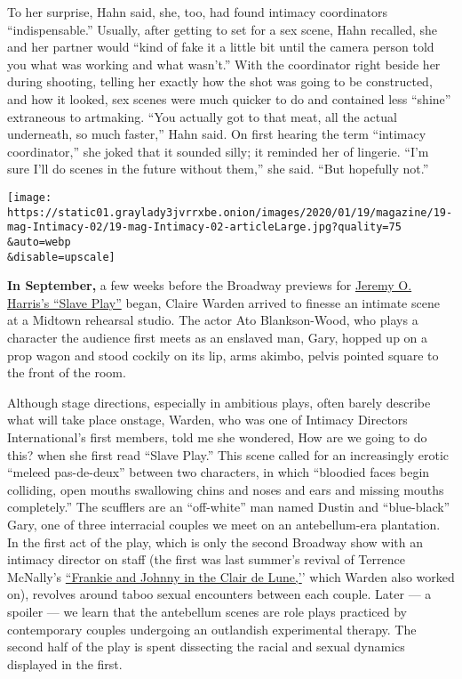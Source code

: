 To her surprise, Hahn said, she, too, had found intimacy coordinators
``indispensable.'' Usually, after getting to set for a sex scene, Hahn
recalled, she and her partner would ``kind of fake it a little bit until
the camera person told you what was working and what wasn't.'' With the
coordinator right beside her during shooting, telling her exactly how
the shot was going to be constructed, and how it looked, sex scenes were
much quicker to do and contained less ``shine'' extraneous to artmaking.
``You actually got to that meat, all the actual underneath, so much
faster,'' Hahn said. On first hearing the term ``intimacy coordinator,''
she joked that it sounded silly; it reminded her of lingerie. ``I'm sure
I'll do scenes in the future without them,'' she said. ``But hopefully
not.''

\texttt{[image: https://static01.graylady3jvrrxbe.onion/images/2020/01/19/magazine/19-mag-Intimacy-02/19-mag-Intimacy-02-articleLarge.jpg?quality=75\\\&auto=webp\\\&disable=upscale]}

\textbf{In September,} a few weeks before the Broadway previews for
\href{https://www.nytimes3xbfgragh.onion/2019/10/06/theater/slave-play-review-broadway.html}{Jeremy
O. Harris's ``Slave Play''} began, Claire Warden arrived to finesse an
intimate scene at a Midtown rehearsal studio. The actor Ato
Blankson-Wood, who plays a character the audience first meets as an
enslaved man, Gary, hopped up on a prop wagon and stood cockily on its
lip, arms akimbo, pelvis pointed square to the front of the room.

Although stage directions, especially in ambitious plays, often barely
describe what will take place onstage, Warden, who was one of Intimacy
Directors International's first members, told me she wondered, How are
we going to do this? when she first read ``Slave Play.'' This scene
called for an increasingly erotic ``meleed pas-de-deux'' between two
characters, in which ``bloodied faces begin colliding, open mouths
swallowing chins and noses and ears and missing mouths completely.'' The
scufflers are an ``off-white'' man named Dustin and ``blue-black'' Gary,
one of three interracial couples we meet on an antebellum-era
plantation. In the first act of the play, which is only the second
Broadway show with an intimacy director on staff (the first was last
summer's revival of Terrence McNally's
\href{https://www.nytimes3xbfgragh.onion/2019/05/30/theater/frankie-and-johnny-review-audra-mcdonald.html}{``Frankie
and Johnny in the Clair de Lune,'}' which Warden also worked on),
revolves around taboo sexual encounters between each couple. Later --- a
spoiler --- we learn that the antebellum scenes are role plays practiced
by contemporary couples undergoing an outlandish experimental therapy.
The second half of the play is spent dissecting the racial and sexual
dynamics displayed in the first.

